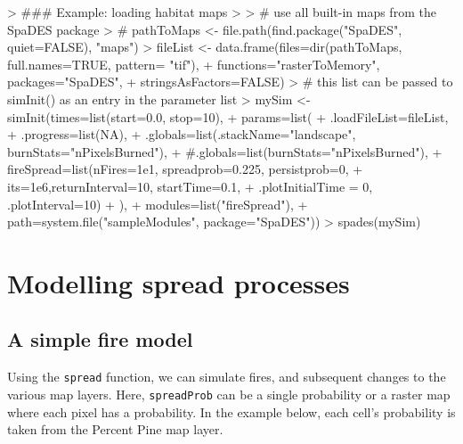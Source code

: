 \documentclass{article}
\begin{document}
\begin{Schunk}
\begin{Sinput}
> ### Example: loading habitat maps
> 
> # use all built-in maps from the SpaDES package
> # pathToMaps <- file.path(find.package("SpaDES", quiet=FALSE), "maps")
> fileList <- data.frame(files=dir(pathToMaps, full.names=TRUE, pattern= "tif"),
+                       functions="rasterToMemory", packages="SpaDES",
+                       stringsAsFactors=FALSE)
> # this list can be passed to simInit() as an entry in the parameter list
> mySim <- simInit(times=list(start=0.0, stop=10),
+                  params=list(
+                    .loadFileList=fileList,
+                    .progress=list(NA),
+                    .globals=list(.stackName="landscape", burnStats="nPixelsBurned"),
+                    #.globals=list(burnStats="nPixelsBurned"),
+                    fireSpread=list(nFires=1e1, spreadprob=0.225, persistprob=0,
+                                    its=1e6,returnInterval=10, startTime=0.1,
+                                    .plotInitialTime = 0, .plotInterval=10)
+                  ),
+                  modules=list("fireSpread"),
+                  path=system.file("sampleModules", package="SpaDES"))
> spades(mySim)
\end{Sinput}
\end{Schunk}

\newpage

\section{Modelling spread processes}

\subsection{A simple fire model}

Using the \texttt{spread} function, we can simulate fires, and subsequent changes to the various map layers. Here, \texttt{spreadProb} can be a single probability or a raster map where each pixel has a probability. In the example below, each cell's probability is taken from the Percent Pine map layer.

\begin{Schunk}
\end{Schunk}
\end{document}
